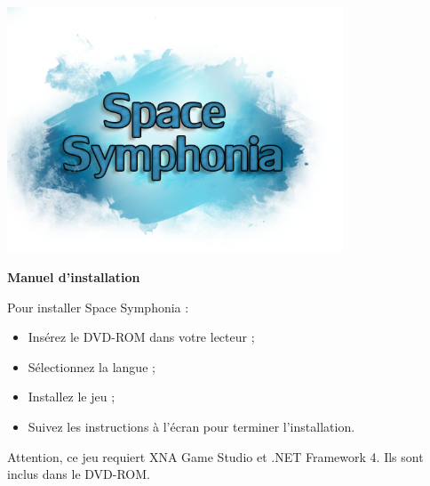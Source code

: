 \documentclass[10pt,a4paper]{article}
\newcommand{\subtitle}{Manuel d'installation}
\begin{document}
		\begin{center}
			\includegraphics[width=10cm]{images/spacesymphonia.png}
			\vspace{0.5cm}
			\par \LARGE{\textbf{\subtitle}}\\
			\vspace{1cm}
			\par Pour installer Space Symphonia :
			\begin{itemize}
				\item Insérez le DVD-ROM dans votre lecteur ;
				\item Sélectionnez la langue ; 
				\item Installez le jeu ;
				\item Suivez les instructions à l'écran pour terminer l'installation.
			\end{itemize}
			\par Attention, ce jeu requiert XNA Game Studio et .NET Framework 4. Ils sont inclus dans le DVD-ROM.
		\end{center}
\end{document}
